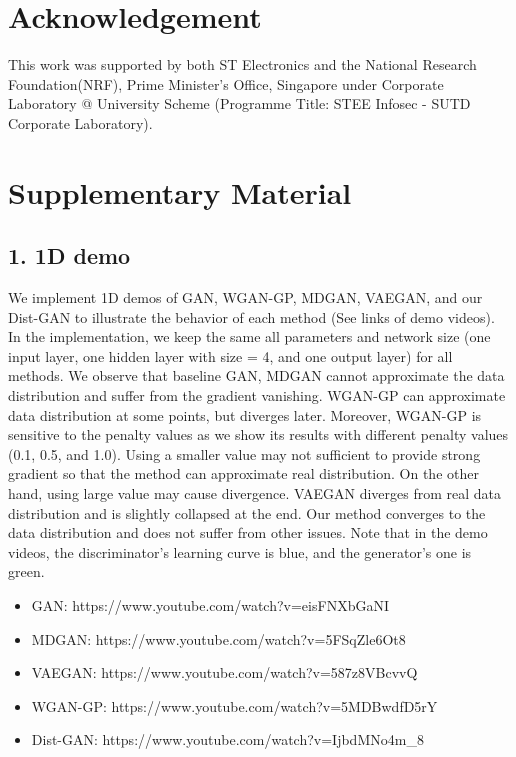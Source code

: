 \documentclass[runningheads]{llncs}
\begin{document}
\section*{Acknowledgement}

This work was supported by both ST Electronics and the National Research Foundation(NRF), Prime Minister's Office, Singapore under Corporate Laboratory @ University Scheme (Programme Title: STEE Infosec - SUTD Corporate Laboratory). 
\clearpage






\section*{Supplementary Material}

\subsection*{1. 1D demo}

We implement 1D demos of GAN, WGAN-GP, MDGAN, VAEGAN, and our Dist-GAN to illustrate the behavior of each method (See links of demo videos). In the implementation, we keep the same all parameters and network size (one input layer, one hidden layer with size = 4, and one output layer) for all methods. We observe that baseline GAN, MDGAN cannot approximate the data distribution and suffer from the gradient vanishing. WGAN-GP can approximate data distribution at some points, but diverges later. Moreover, WGAN-GP is sensitive to the penalty values as we show its results with different penalty values (0.1, 0.5, and 1.0). Using a  smaller value may not sufficient to provide strong gradient so that the method can approximate real distribution. On the other hand, using large value may cause divergence. VAEGAN diverges from real data distribution and is slightly collapsed at the end. Our method converges to the data distribution and does not suffer from other issues. Note that in the demo videos, the discriminator's learning curve is blue, and the generator's one is green.

\begin{itemize}
\item GAN: https://www.youtube.com/watch?v=eisFNXbGaNI
\item MDGAN: https://www.youtube.com/watch?v=5FSqZle6Ot8
\item VAEGAN: https://www.youtube.com/watch?v=587z8VBcvvQ
\item WGAN-GP: https://www.youtube.com/watch?v=5MDBwdfD5rY
\item Dist-GAN: https://www.youtube.com/watch?v=IjbdMNo4m\_8
\end{itemize}
\end{document}
